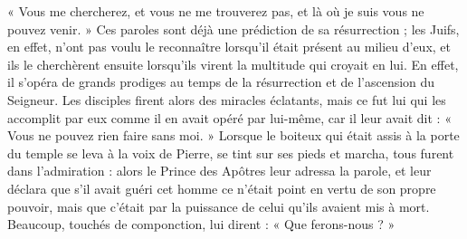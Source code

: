  « Vous me chercherez, et vous ne me trouverez pas, et là où je suis vous ne pouvez venir. » Ces paroles sont déjà une prédiction de sa résurrection ; les Juifs, en effet, n’ont pas voulu le reconnaître lorsqu’il était présent au milieu d’eux, et ils le cherchèrent ensuite lorsqu’ils virent la multitude qui croyait en lui. En effet, il s’opéra de grands prodiges au temps de la résurrection et de l’ascension du Seigneur. Les disciples firent alors des miracles éclatants, mais ce fut lui qui les accomplit par eux comme il en avait opéré par lui-même, car il leur avait dit : « Vous ne pouvez rien faire sans moi. » Lorsque le boiteux qui était assis à la porte du temple se leva à la voix de Pierre, se tint sur ses pieds et marcha, tous furent dans l’admiration : alors le Prince des Apôtres leur adressa la parole, et leur déclara que s’il avait guéri cet homme ce n’était point en vertu de son propre pouvoir, mais que c’était par la puissance de celui qu’ils avaient mis à mort. Beaucoup, touchés de componction, lui dirent : « Que ferons-nous ? »